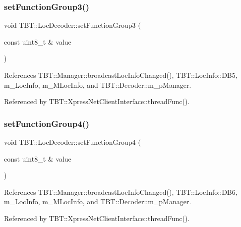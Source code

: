 \subsubsection{\texorpdfstring{set\+Function\+Group3()}{setFunctionGroup3()}}
{\footnotesize\ttfamily void T\+B\+T\+::\+Loc\+Decoder\+::set\+Function\+Group3 (\begin{DoxyParamCaption}\item[{const uint8\+\_\+t \&}]{value }\end{DoxyParamCaption})\hspace{0.3cm}{\ttfamily [inline]}}



References T\+B\+T\+::\+Manager\+::broadcast\+Loc\+Info\+Changed(), T\+B\+T\+::\+Loc\+Info\+::\+D\+B5, m\+\_\+\+Loc\+Info, m\+\_\+\+M\+Loc\+Info, and T\+B\+T\+::\+Decoder\+::m\+\_\+p\+Manager.



Referenced by T\+B\+T\+::\+Xpress\+Net\+Client\+Interface\+::thread\+Func().

\mbox{\label{classTBT_1_1LocDecoder_a5b7c569ddccfe68faef7136bf27fadb8_a5b7c569ddccfe68faef7136bf27fadb8}} 
\subsubsection{\texorpdfstring{set\+Function\+Group4()}{setFunctionGroup4()}}
{\footnotesize\ttfamily void T\+B\+T\+::\+Loc\+Decoder\+::set\+Function\+Group4 (\begin{DoxyParamCaption}\item[{const uint8\+\_\+t \&}]{value }\end{DoxyParamCaption})\hspace{0.3cm}{\ttfamily [inline]}}



References T\+B\+T\+::\+Manager\+::broadcast\+Loc\+Info\+Changed(), T\+B\+T\+::\+Loc\+Info\+::\+D\+B6, m\+\_\+\+Loc\+Info, m\+\_\+\+M\+Loc\+Info, and T\+B\+T\+::\+Decoder\+::m\+\_\+p\+Manager.



Referenced by T\+B\+T\+::\+Xpress\+Net\+Client\+Interface\+::thread\+Func().

\mbox{\label{classTBT_1_1LocDecoder_a30659350a469bda322d276ee17b1b89c_a30659350a469bda322d276ee17b1b89c}} 
